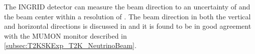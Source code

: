 The INGRID detector can measure the beam direction to an uncertainty of  and the beam center within a resolution of  \cite{t2k_det}. The beam direction in both the vertical and horizontal directions is discussed in \cite{Suzuki_2015} and it is found to be in good agreement with the MUMON monitor described in \autoref{subsec:T2KSKExp_T2K_NeutrinoBeam}.


